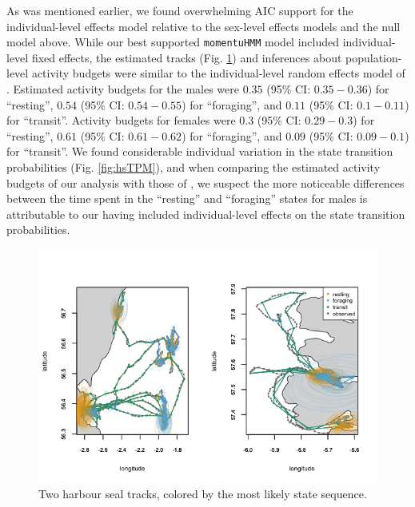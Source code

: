 \documentclass[12pt]{article}\usepackage[]{graphicx}\usepackage[]{color}
\begin{document}
As was mentioned earlier, we found overwhelming AIC support for the individual-level effects model relative to the sex-level effects models and the null model above. While our best supported \verb|momentuHMM| model included individual-level fixed effects, the estimated tracks (Fig. \ref{fig:hsTracks}) and inferences about population-level activity budgets were similar to the individual-level random effects model of \cite{McClintockEtAl2013c}. Estimated activity budgets for the males were $0.35$ (95\% CI: $0.35-0.36$) for ``resting'', $0.54$ (95\% CI: $0.54-0.55$) for ``foraging'', and $0.11$ (95\% CI: $0.1-0.11$) for ``transit''.  Activity budgets for females were $0.3$ (95\% CI: $0.29-0.3$) for ``resting'', $0.61$ (95\% CI: $0.61-0.62$) for ``foraging'', and $0.09$ (95\% CI: $0.09-0.1$) for ``transit''. We found considerable individual variation in the state transition probabilities (Fig. \ref{fig:hsTPM}), and when comparing the estimated activity budgets of our analysis with those of \cite{McClintockEtAl2013c}, we suspect the more noticeable differences between the time spent in the ``resting'' and ``foraging'' states for males is attributable to our having included individual-level effects on the state transition probabilities.  
\begin{figure}[htbp]
  \centering
  \includegraphics[width=\textwidth]{plot_harbourSeal.png}
  \caption{Two harbour seal tracks, colored by the most likely state sequence.}
  \label{fig:hsTracks}
\end{figure}
\end{document}
